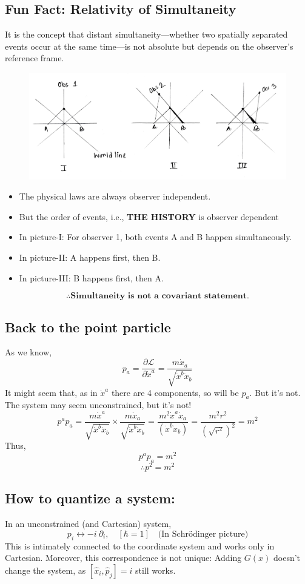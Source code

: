 \documentclass[14pt]{article} %
\begin{document}
\subsection*{Fun Fact: Relativity of Simultaneity}
It is the concept that distant simultaneity—whether two spatially separated events occur at the same time—is not absolute but depends on the observer's reference frame.
\begin{figure}[H]
\centering
\includegraphics[width=0.9\linewidth]{L0_1 (1).jpg}
\caption*{}
\end{figure}
\vspace{-1.5cm}
\begin{itemize}
    \item The physical laws are always observer independent.
    \item But the order of events, i.e., \textbf{THE HISTORY} is observer dependent
    \item In picture-I: For observer 1, both events A and B happen simultaneously.
    \item In picture-II: A happens first, then B.
    \item In picture-III: B happens first, then A.
\end{itemize}
$$ \boxed{\therefore \textbf{Simultaneity is not a covariant statement.}} $$
\subsection*{Back to the point particle}
As we know,
\[
p_a = \frac{\partial \mathcal{L}}{\partial \dot{x}^a} = \frac{m \dot{x}_a}{\sqrt{\dot{x}^b \dot{x}_b}}
\]
It might seem that, as in $\dot{x}^a$ there are 4 components, so will be $p_a$. But it's not. The system may seem unconstrained, but it's not!
\[
p^a p_a = \frac{m \dot{x}^a}{\sqrt{\dot{x}^b \dot{x}_b}} \times \frac{m \dot{x}_a}{\sqrt{\dot{x}^b \dot{x}_b}} = \frac{m^2 \dot{x}^a \dot{x}_a}{(\dot{x}^b \dot{x}_b)} = \frac{m^2r^2}{(\sqrt{r^2})^2} = m^2
\]
Thus,
\[
p^a p_a = m^2
\]
\[
\therefore p^2 = m^2 \tag{5} \label{eq:5}
\]
\subsection*{How to quantize a system:}
In an unconstrained (and Cartesian) system,
\[
p_i \leftrightarrow -i ~\partial_i, \quad [\hbar = 1] \quad \text{(In Schrödinger picture)}
\]
This is intimately connected to the coordinate system and works only in Cartesian. Moreover, this correspondence is not unique: Adding $G(x)$ doesn't change the system, as $[\hat{x}_i, \hat{p}_j] = i$ still works.
\end{document}
